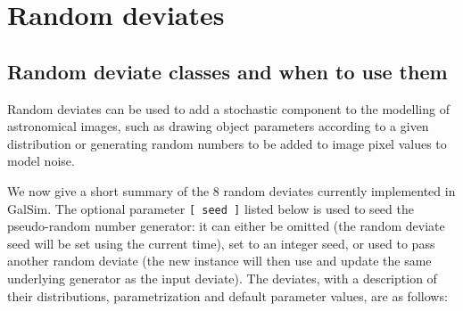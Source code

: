 \documentclass[preprint,11pt]{aastex}
\begin{document}
\section{Random deviates}\label{sect:random}
\subsection{Random deviate classes and when to use them}
Random deviates can be used to add a stochastic
component to the modelling of astronomical images, such as drawing
object parameters according to a given distribution or generating random
numbers to be added to image pixel values to model noise. 

We now give a short summary of the 8 random deviates currently
implemented in GalSim.   The optional parameter \texttt{[ seed ]}
listed below is used
to seed the pseudo-random number generator: it can
either be omitted (the random deviate seed will be set using the
current time), set to an integer seed, or used to pass another random
deviate (the new instance will then use and update the same underlying
generator as the input deviate).
The deviates, with a description of their distributions, parametrization and
default parameter values, are as follows:
\end{document}
